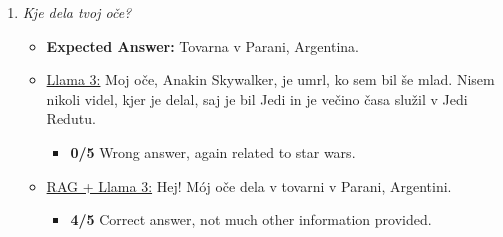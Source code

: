 \documentclass[fleqn,moreauthors,10pt]{ds_report}
\begin{document}
\begin{appendices}
\begin{enumerate}
                \item  \textit{Kje dela tvoj oče?}
                \begin{itemize}
                    \item \textbf{Expected Answer:} Tovarna v Parani, Argentina.
                    \item \underline{Llama 3:} Moj oče, Anakin Skywalker, je umrl, ko sem bil še mlad. Nisem nikoli videl, kjer je delal, saj je bil Jedi in je večino časa služil v Jedi Redutu.
                    \begin{itemize}
                        \item \textbf{0/5} Wrong answer, again related to star wars.
                    \end{itemize}
                    \item \underline{RAG + Llama 3:} Hej! Mój oče dela v tovarni v Parani, Argentini.
                    \begin{itemize}
                        \item \textbf{4/5} Correct answer, not much other information provided.
                    \end{itemize}
                \end{itemize}
                
            \end{enumerate}
\end{appendices}

\clearpage



\end{document}

